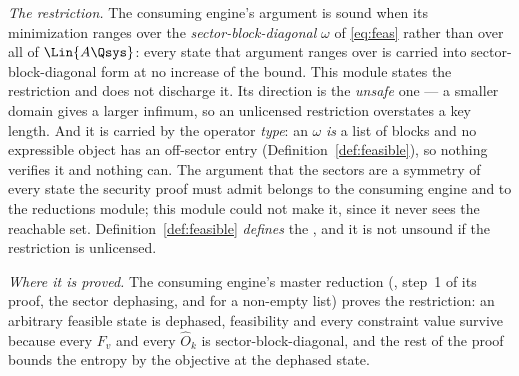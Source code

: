 
\begin{remark}\label{rem:block-restriction}
\emph{The restriction.} The consuming engine's argument is sound when its
minimization ranges over the \emph{sector-block-diagonal} $\omega$ of
\eqref{eq:feas} rather than over all of $\Lin{A\Qsys}$: every state that
argument ranges over is carried into sector-block-diagonal form at no increase
of the bound. This module states the restriction and does not discharge it.
Its direction is the \emph{unsafe} one --- a smaller domain gives a larger
infimum, so an unlicensed restriction overstates a key length. And it is
carried by the operator \emph{type}: an $\omega$ \emph{is} a list of blocks
and no expressible object has an off-sector entry
(Definition~\ref{def:feasible}), so nothing verifies it and nothing can. The
argument that the sectors are a symmetry of every state the security proof
must admit belongs to the consuming engine and to the reductions module; this
module could not make it, since it never sees the reachable set.
Definition~\ref{def:feasible} \emph{defines} the , and it
is not unsound if the restriction is unlicensed.

\emph{Where it is proved.} The consuming engine's master reduction
(, step~1 of its proof, the sector dephasing,
and  for a non-empty list) proves
the restriction: an arbitrary feasible state is dephased, feasibility and
every constraint value survive because every $F_v$ and every $\hat O_k$ is
sector-block-diagonal, and the rest of the proof bounds the entropy by the
objective at the dephased state.


\end{remark}
